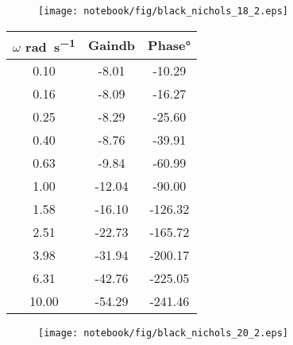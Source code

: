 \begin{figure}[!h]
\begin{center}
    \texttt{[image: notebook/fig/black\_nichols\_18\_2.eps]}
\end{center}
\end{figure}

\begin{center}
\begin{tabular}{ccc}
\hline
$\omega$ \si{\radian\per\second} & Gain\si{\decibel} & Phase\si{\degree}\\
\hline
0.10 & -8.01 & -10.29\\
0.16 & -8.09 & -16.27\\
0.25 & -8.29 & -25.60\\
0.40 & -8.76 & -39.91\\
0.63 & -9.84 & -60.99\\
1.00 & -12.04 & -90.00\\
1.58 & -16.10 & -126.32\\
2.51 & -22.73 & -165.72\\
3.98 & -31.94 & -200.17\\
6.31 & -42.76 & -225.05\\
10.00 & -54.29 & -241.46\\
\hline
\end{tabular}
\end{center}

\begin{figure}[!h]
\begin{center}
    \texttt{[image: notebook/fig/black\_nichols\_20\_2.eps]}
\end{center}
\end{figure}
    

